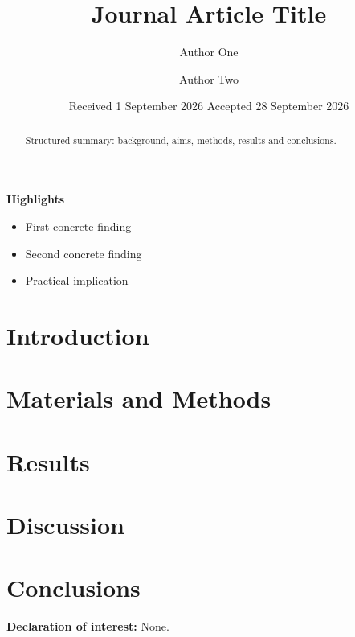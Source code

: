 \documentclass[12pt]{article}
\title{Journal Article Title}
\author{Author One \and Author Two}
\date{Received 1 September 2026 \quad Accepted 28 September 2026}
\begin{document}
\maketitle

\begin{abstract}
Structured summary: background, aims, methods, results and conclusions.
\end{abstract}

\textbf{Highlights}
\begin{itemize}
  \item First concrete finding
  \item Second concrete finding
  \item Practical implication
\end{itemize}

\section{Introduction}
\section{Materials and Methods}
\section{Results}
\section{Discussion}
\section{Conclusions}

\textbf{Declaration of interest:} None.
\end{document}
